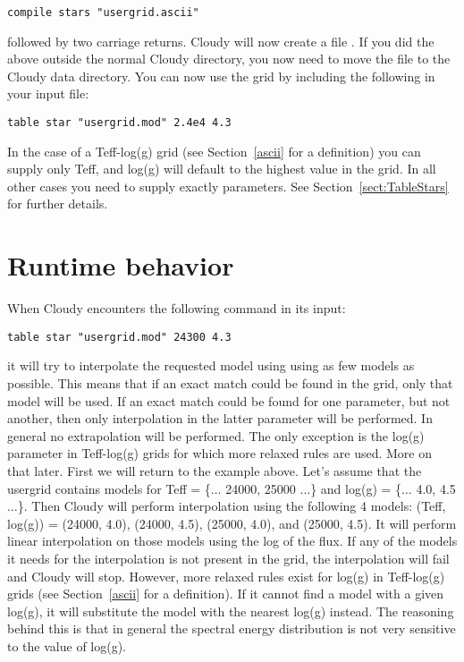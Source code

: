 \begin{verbatim}
compile stars "usergrid.ascii"
\end{verbatim}

followed by two carriage returns. Cloudy will now create a file
. If you did the above outside the normal Cloudy
directory, you now need to move the  file to the
Cloudy data directory. You can now use the grid by including the following in
your input file:

\begin{verbatim}
table star "usergrid.mod" 2.4e4 4.3
\end{verbatim}

In the case of a Teff-log(g) grid (see Section~\ref{ascii} for a definition)
you can supply only Teff, and log(g) will default to the highest value in the
grid. In all other cases you need to supply exactly 
parameters. See Section~\ref{sect:TableStars} for further details.

\section{Runtime behavior}
\label{runtime}

When Cloudy encounters the following command in its input:

\begin{verbatim}
table star "usergrid.mod" 24300 4.3
\end{verbatim}

it will try to interpolate the requested model using using as few models as
possible. This means that if an exact match could be found in the grid, only
that model will be used. If an exact match could be found for one parameter,
but not another, then only interpolation in the latter parameter will be
performed. In general no extrapolation will be performed. The only exception
is the log(g) parameter in Teff-log(g) grids for which more relaxed rules are
used. More on that later. First we will return to the example above. Let's
assume that the usergrid contains models for Teff = \{$\ldots$ 24000, 25000
$\ldots$\} and log(g) = \{$\ldots$ 4.0, 4.5 $\ldots$\}. Then Cloudy will
perform interpolation using the following 4 models: (Teff, log(g)) = (24000,
4.0), (24000, 4.5), (25000, 4.0), and (25000, 4.5). It will perform linear
interpolation on those models using the log of the flux. If any of the models
it needs for the interpolation is not present in the grid, the interpolation
will fail and Cloudy will stop. However, more relaxed rules exist for log(g)
in Teff-log(g) grids (see Section~\ref{ascii} for a definition). If it cannot
find a model with a given log(g), it will substitute the model with the
nearest log(g) instead. The reasoning behind this is that in general the
spectral energy distribution is not very sensitive to the value of log(g).
